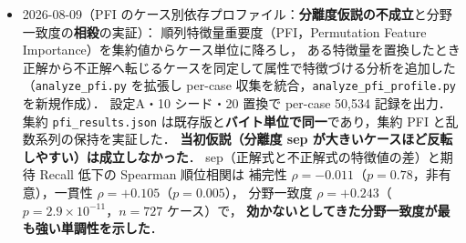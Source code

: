 \documentclass[11pt,a4paper]{jsarticle}
\begin{document}
\begin{itemize}[nosep]
    (2)\,PFI で各特徴量の重要度を測った，の 2 点に限定し，
    正解・不正解のケース分析（誤りの内訳・誤りの 2 型・被覆率）と
    PFI のケース別分解（分野一致度の相殺）は次回に回して本文から外した．
    実験 1 は較正の箱ひげ図（\texttt{fig\_similarity\_scale}）を主図に据え，
    候補内 AUC は表に集約した（全 DB 0.950 対 候補 50 件 0.594）．
    実験 2 は 10 特徴量と 2 群の PFI 図（\texttt{fig\_pfi\_importance}）を主図とした
    （変数の重なり 6 特徴量 $+0.678$，話題の近さ 4 特徴量 $+0.006$，$p=0.10$）．
    図の凡例・軸ラベルを報告書の用語に統一（テキスト類似→文章類似度，入出力Jaccard→変数の一致度，
    意味類似(SVD)→意味の近さ，特化度→式の特化度 等．プログラム識別子を排除）し，
    \texttt{generate\_pfi\_figure.py} と \texttt{calibrate\_similarity\_scale.py} の図サイズと表題を調整した．
    意味の近さ・式の特化度・分野の一致・分野の一致（集合版）の定義を本文に加え，自己完結させた．
    その後，本人指摘「図の文字が小さすぎる」を受けて\textbf{両図の文字を 1.5 倍}にした
    （両スクリプトに倍率定数 \texttt{FS} を導入し，目盛り・軸ラベル・凡例・値ラベル・表題の全指定に適用）．
    図の外形寸法は 1\% 以内で不変なので，報告書に同じ幅で貼ったときの実寸がそのまま 1.5 倍になる．
    PFI 図は文字拡大で(b)の縦軸ラベルが枠外へはみ出したため，
    ラベルを「Recall@K の低下」に短縮し左右のパネル幅比を 2.3:1 から 2.0:1 に変えた．
    さらに本人指示で実験 2 の節題を
    「各特徴量の重要度を PFI（Permutation Feature Importance）方法で測る」に変更し，
    略語 PFI を \S 2 の初出で導入して \S 4 本文の重複した正式名称を外した
    （英語名が節題で改行分断されないよう \texttt{\textbackslash mbox} で囲んだ）．
  \item 2026-08-09（PFI のケース別依存プロファイル：\textbf{分離度仮説の不成立}と分野一致度の\textbf{相殺}の実証）：
    順列特徴量重要度（PFI，Permutation Feature Importance）を集約値からケース単位に降ろし，
    ある特徴量を置換したとき正解から不正解へ転じるケースを同定して属性で特徴づける分析を追加した
    （\texttt{analyze\_pfi.py} を拡張し per-case 収集を統合，\texttt{analyze\_pfi\_profile.py} を新規作成）．
    設定A・10 シード・20 置換で per-case 50,534 記録を出力．
    集約 \texttt{pfi\_results.json} は既存版と\textbf{バイト単位で同一}であり，集約 PFI と乱数系列の保持を実証した．
    \textbf{当初仮説（分離度 sep が大きいケースほど反転しやすい）は成立しなかった}．
    sep（正解式と不正解式の特徴値の差）と期待 Recall 低下の Spearman 順位相関は
    補完性 $\rho=-0.011$（$p=0.78$，非有意），一貫性 $\rho=+0.105$（$p=0.005$），
    分野一致度 $\rho=+0.243$（$p=2.9\times10^{-11}$，$n=727$ ケース）で，
    \textbf{効かないとしてきた分野一致度が最も強い単調性を示した}．

\end{itemize}
\end{document}
